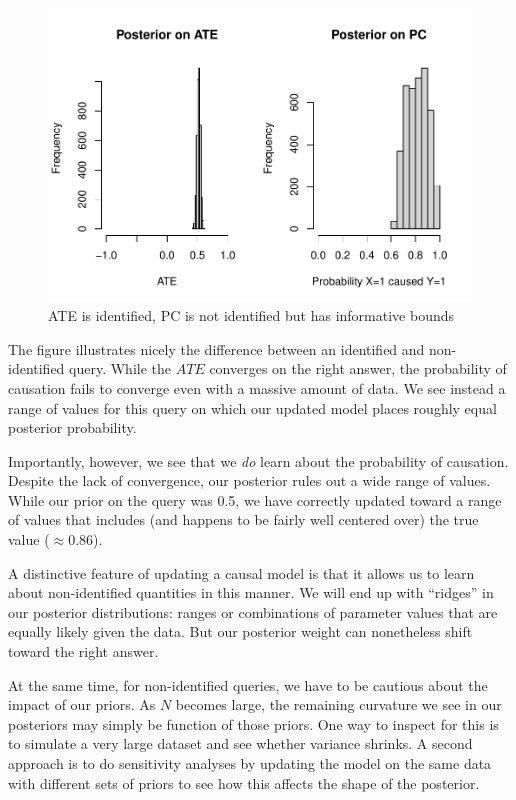 \documentclass[
  12pt,
]{book}
\begin{document}
\begin{figure}
\centering
\includegraphics{ii_files/figure-latex/PChist-1.pdf}
\caption{\label{fig:PChist}ATE is identified, PC is not identified but has informative bounds}
\end{figure}

The figure illustrates nicely the difference between an identified and non-identified query. While the \(ATE\) converges on the right answer, the probability of causation fails to converge even with a massive amount of data. We see instead a range of values for this query on which our updated model places roughly equal posterior probability.

Importantly, however, we see that we \emph{do} learn about the probability of causation. Despite the lack of convergence, our posterior rules out a wide range of values. While our prior on the query was 0.5, we have correctly updated toward a range of values that includes (and happens to be fairly well centered over) the true value (\(\approx 0.86\)).

A distinctive feature of updating a causal model is that it allows us to learn about non-identified quantities in this manner. We will end up with ``ridges'' in our posterior distributions: ranges or combinations of parameter values that are equally likely given the data. But our posterior weight can nonetheless shift toward the right answer.

At the same time, for non-identified queries, we have to be cautious about the impact of our priors. As \(N\) becomes large, the remaining curvature we see in our posteriors may simply be function of those priors. One way to inspect for this is to simulate a very large dataset and see whether variance shrinks. A second approach is to do sensitivity analyses by updating the model on the same data with different sets of priors to see how this affects the shape of the posterior.
\end{document}
